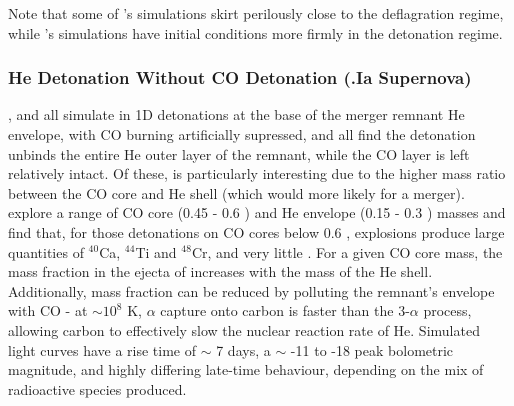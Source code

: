 Note that some of \cite{wald+10}'s simulations skirt perilously close to the deflagration regime, while \cite{shen+10}'s simulations have initial conditions more firmly in the detonation regime.

\subsubsection{He Detonation Without CO Detonation (.Ia Supernova)}


\cite{woosk10}, \cite{shen+10} and \cite{wald+10} all simulate in 1D detonations at the base of the merger remnant He envelope, with CO burning artificially supressed, and all find the detonation unbinds the entire He outer layer of the remnant, while the CO layer is left relatively intact.  Of these, \citeauthor{wald+10} is particularly interesting due to the higher mass ratio between the CO core and He shell (which would more likely for a merger).  \citeauthor{wald+10} explore a range of CO core (0.45 - 0.6 {\Msun}) and He envelope (0.15 - 0.3 {\Msun}) masses and find that, for those detonations on CO cores below 0.6 {\Msun}, explosions produce large quantities of $^{40}$Ca, $^{44}$Ti and $^{48}$Cr, and very little {\Ni}.  For a given CO core mass, the mass fraction in the ejecta of {\Ni} increases with the mass of the He shell.  Additionally, {\Ni} mass fraction can be reduced by polluting the remnant's envelope with CO - at $\sim 10^8$ K, $\alpha$ capture onto carbon is faster than the 3-$\alpha$ process, allowing carbon to effectively slow the nuclear reaction rate of He.  Simulated light curves have a rise time of $\sim$ 7 days, a $\sim$ -11 to -18 peak bolometric magnitude, and highly differing late-time behaviour, depending on the mix of radioactive species produced.

